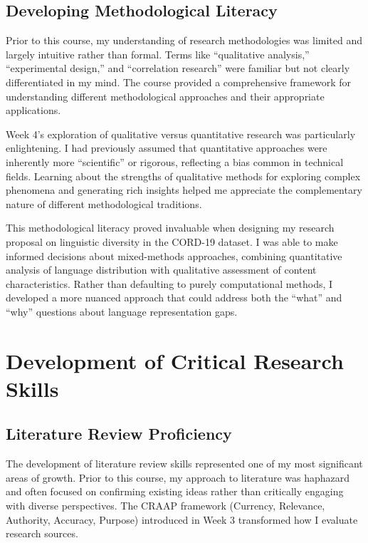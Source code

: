 \documentclass[
]{article}
\begin{document}
\subsection{Developing Methodological
Literacy}\label{developing-methodological-literacy}

Prior to this course, my understanding of research methodologies was
limited and largely intuitive rather than formal. Terms like
``qualitative analysis,'' ``experimental design,'' and ``correlation
research'' were familiar but not clearly differentiated in my mind. The
course provided a comprehensive framework for understanding different
methodological approaches and their appropriate applications.

Week 4's exploration of qualitative versus quantitative research was
particularly enlightening. I had previously assumed that quantitative
approaches were inherently more ``scientific'' or rigorous, reflecting a
bias common in technical fields. Learning about the strengths of
qualitative methods for exploring complex phenomena and generating rich
insights helped me appreciate the complementary nature of different
methodological traditions.

This methodological literacy proved invaluable when designing my
research proposal on linguistic diversity in the CORD-19 dataset. I was
able to make informed decisions about mixed-methods approaches,
combining quantitative analysis of language distribution with
qualitative assessment of content characteristics. Rather than
defaulting to purely computational methods, I developed a more nuanced
approach that could address both the ``what'' and ``why'' questions
about language representation gaps.

\section{Development of Critical Research
Skills}\label{development-of-critical-research-skills}

\subsection{Literature Review
Proficiency}\label{literature-review-proficiency}

The development of literature review skills represented one of my most
significant areas of growth. Prior to this course, my approach to
literature was haphazard and often focused on confirming existing ideas
rather than critically engaging with diverse perspectives. The CRAAP
framework (Currency, Relevance, Authority, Accuracy, Purpose) introduced
in Week 3 transformed how I evaluate research sources.
\end{document}
